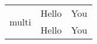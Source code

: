 \documentclass{article}
\begin{document}
	\begin{table}
		\begin{tabular}{|c|c|c|}
			\multirow{2}{*}{multi} & Hello & You \\
			& Hello & You \\
		\end{tabular}
	\end{table}
\end{document}
